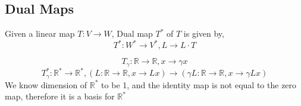 \documentclass[11pt,a4paper]{colorart}
\def\l{\left}
\def\r{\right}
\def\R{\mathbb{R}}
\def\g{\gamma}
\begin{document}
\subsection{Dual Maps}

\begin{definition}
	Given a linear map $T:V\rightarrow W$, Dual map $T^*$ of $T$ is given by,
	\[T^*:W^*\rightarrow V^*, L \rightarrow L\cdot T \]
\end{definition}

\begin{example}
	\[ T_\g : \R \rightarrow \R, x \rightarrow \g x \]
	\[ T_\g^* : \R^* \rightarrow \R^*, \l(L:\R \rightarrow \R,x \rightarrow Lx\r) \rightarrow \l(\g L : \R \rightarrow \R, x \rightarrow \g Lx \r) \]
	We know dimension of $\R^*$ to be 1, and the identity map is not equal to the zero map, therefore it is a basis for $\R^*$
\end{example}
\end{document}
